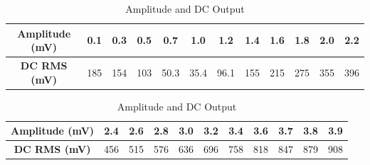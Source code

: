 \documentclass[a4paper,12pt]{article}
\begin{document}
\begin{table}[h!]
    \centering
    \caption{Amplitude and DC Output}
    \label{tab:amp_dc}
    \begin{tabular}{|c|c|c|c|c|c|c|c|c|c|c|c|}
    \hline
    \textbf{Amplitude (mV)} & 0.1 & 0.3 & 0.5 & 0.7 & 1.0 & 1.2 & 1.4 & 1.6 & 1.8 & 2.0 & 2.2 \\ \hline
    \textbf{DC RMS (mV)} & 185 & 154 & 103 & 50.3 & 35.4 & 96.1 & 155 & 215 & 275 & 355 & 396 \\ \hline
    \end{tabular}
    
    \vspace{0.5cm}
    
    \begin{tabular}{|c|c|c|c|c|c|c|c|c|c|c|}
    \hline
    \textbf{Amplitude (mV)} & 2.4 & 2.6 & 2.8 & 3.0 & 3.2 & 3.4 & 3.6 & 3.7 & 3.8 & 3.9 \\ \hline
    \textbf{DC RMS (mV)} & 456 & 515 & 576 & 636 & 696 & 758 & 818 & 847 & 879 & 908 \\ \hline
    \end{tabular}
\end{table}
\end{document}
